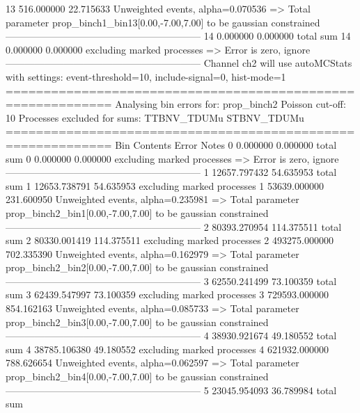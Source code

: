 13         516.000000      22.715633       Unweighted events, alpha=0.070536
  => Total parameter prop_binch1_bin13[0.00,-7.00,7.00] to be gaussian constrained
------------------------------------------------------------
14         0.000000        0.000000        total sum                     
14         0.000000        0.000000        excluding marked processes    
  => Error is zero, ignore      
------------------------------------------------------------
Channel ch2 will use autoMCStats with settings: event-threshold=10, include-signal=0, hist-mode=1
============================================================
Analysing bin errors for: prop_binch2
Poisson cut-off: 10
Processes excluded for sums: TTBNV_TDUMu STBNV_TDUMu
============================================================
Bin        Contents        Error           Notes                         
0          0.000000        0.000000        total sum                     
0          0.000000        0.000000        excluding marked processes    
  => Error is zero, ignore      
------------------------------------------------------------
1          12657.797432    54.635953       total sum                     
1          12653.738791    54.635953       excluding marked processes    
1          53639.000000    231.600950      Unweighted events, alpha=0.235981
  => Total parameter prop_binch2_bin1[0.00,-7.00,7.00] to be gaussian constrained
------------------------------------------------------------
2          80393.270954    114.375511      total sum                     
2          80330.001419    114.375511      excluding marked processes    
2          493275.000000   702.335390      Unweighted events, alpha=0.162979
  => Total parameter prop_binch2_bin2[0.00,-7.00,7.00] to be gaussian constrained
------------------------------------------------------------
3          62550.241499    73.100359       total sum                     
3          62439.547997    73.100359       excluding marked processes    
3          729593.000000   854.162163      Unweighted events, alpha=0.085733
  => Total parameter prop_binch2_bin3[0.00,-7.00,7.00] to be gaussian constrained
------------------------------------------------------------
4          38930.921674    49.180552       total sum                     
4          38785.106380    49.180552       excluding marked processes    
4          621932.000000   788.626654      Unweighted events, alpha=0.062597
  => Total parameter prop_binch2_bin4[0.00,-7.00,7.00] to be gaussian constrained
------------------------------------------------------------
5          23045.954093    36.789984       total sum                     
